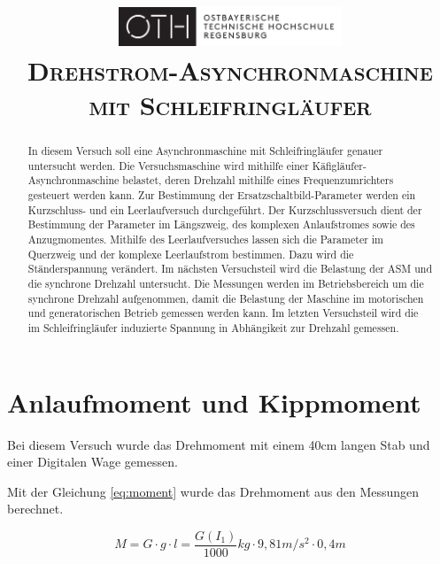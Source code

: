 \documentclass[conference]{IEEEtran}
\begin{document}
\title{
    \centering
    \includegraphics[width=0.5\textwidth]{../OTHR_OTHR_Logo.pdf}\\
    \textsc{Drehstrom-Asynchronmaschine mit Schleifringläufer} \\
}

\maketitle

\begin{abstract}
    In diesem Versuch soll eine Asynchronmaschine mit Schleifringläufer genauer
    untersucht werden. Die Versuchsmaschine wird mithilfe einer Käfigläufer-Asynchronmaschine 
    belastet, deren Drehzahl mithilfe eines Frequenzumrichters gesteuert werden kann.
    Zur Bestimmung der Ersatzschaltbild-Parameter werden ein Kurzschluss- und ein Leerlaufversuch 
    durchgeführt. Der Kurzschlussversuch dient der Bestimmung der Parameter im Längszweig, des 
    komplexen Anlaufstromes sowie des Anzugmomentes. Mithilfe des Leerlaufversuches lassen sich die 
    Parameter im Querzweig und der komplexe Leerlaufstrom bestimmen. Dazu wird die Ständerspannung
    verändert. Im nächsten Versuchsteil wird die Belastung der ASM und die synchrone Drehzahl untersucht.
    Die Messungen werden im Betriebsbereich um die synchrone Drehzahl aufgenommen, damit die Belastung der
    Maschine im motorischen und generatorischen Betrieb gemessen werden kann. Im letzten Versuchsteil
    wird die im Schleifringläufer induzierte Spannung in Abhängikeit zur Drehzahl gemessen.

\end{abstract}

\section{Anlaufmoment und Kippmoment}

Bei diesem Versuch wurde das Drehmoment mit einem 40cm langen Stab und einer
Digitalen Wage gemessen.

Mit der Gleichung \ref{eq:moment} wurde das Drehmoment aus den Messungen berechnet.

\begin{equation} \label{eq:moment}
    M=G\cdot g\cdot l = \frac{G(I_1)}{1000}\si{kg}\cdot 9,81\si{m/s^2} \cdot 0,4\si{m}
\end{equation}
\end{document}
